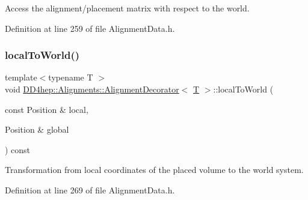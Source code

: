 Access the alignment/placement matrix with respect to the world. 



Definition at line 259 of file Alignment\+Data.\+h.

\hypertarget{class_d_d4hep_1_1_alignments_1_1_alignment_decorator_a5d70fc5ba5a8dad692317207458a57fd}{}\label{class_d_d4hep_1_1_alignments_1_1_alignment_decorator_a5d70fc5ba5a8dad692317207458a57fd} 
\subsubsection{\texorpdfstring{local\+To\+World()}{localToWorld()}\hspace{0.1cm}{\footnotesize\ttfamily [2/3]}}
{\footnotesize\ttfamily template$<$typename T $>$ \\
void \hyperlink{class_d_d4hep_1_1_alignments_1_1_alignment_decorator}{D\+D4hep\+::\+Alignments\+::\+Alignment\+Decorator}$<$ \hyperlink{class_t}{T} $>$\+::local\+To\+World (\begin{DoxyParamCaption}\item[{const Position \&}]{local,  }\item[{Position \&}]{global }\end{DoxyParamCaption}) const\hspace{0.3cm}{\ttfamily [inline]}}



Transformation from local coordinates of the placed volume to the world system. 



Definition at line 269 of file Alignment\+Data.\+h.

\hypertarget{class_d_d4hep_1_1_alignments_1_1_alignment_decorator_a60bcb9a0fd83b49f845bf7e7c1352c53}{}\label{class_d_d4hep_1_1_alignments_1_1_alignment_decorator_a60bcb9a0fd83b49f845bf7e7c1352c53} 
